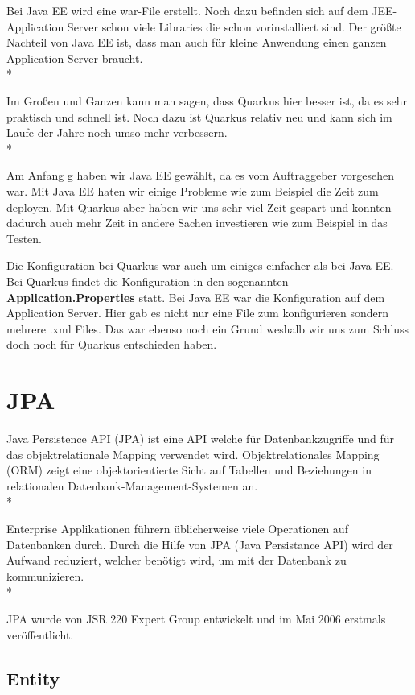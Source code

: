 Bei Java EE wird eine war-File erstellt. Noch dazu befinden sich auf dem JEE-Application Server schon viele Libraries die schon vorinstalliert sind. 
Der größte Nachteil von Java EE ist, dass man auch für kleine Anwendung einen ganzen Application Server braucht. \\*

Im Großen und Ganzen kann man sagen, dass Quarkus hier besser ist, da es sehr praktisch und schnell ist. 
Noch dazu ist Quarkus relativ neu und kann sich im Laufe der Jahre noch umso mehr verbessern. \\*

Am Anfang g haben wir Java EE gewählt, da es vom Auftraggeber vorgesehen war. Mit Java EE haten wir einige Probleme wie zum Beispiel die Zeit zum deployen. 
Mit Quarkus aber haben wir uns sehr viel Zeit gespart und konnten dadurch auch mehr Zeit in andere Sachen investieren wie zum Beispiel in das Testen.

Die Konfiguration bei Quarkus war auch um einiges einfacher als bei Java EE. Bei Quarkus findet die Konfiguration in den sogenannten \textbf{Application.Properties} statt.
Bei Java EE war die Konfiguration auf dem Application Server. Hier gab es nicht nur eine File zum konfigurieren sondern mehrere .xml Files. 
Das war ebenso noch ein Grund weshalb wir uns zum Schluss doch noch für Quarkus entschieden haben.

\pagebreak

\section{JPA}
\author{David Ignjatovic} 

Java Persistence API (JPA) ist eine API welche für Datenbankzugriffe und für das objektrelationale Mapping verwendet wird. 
Objektrelationales Mapping (ORM) zeigt eine objektorientierte Sicht auf Tabellen und Beziehungen in relationalen Datenbank-Management-Systemen an.  \\*

Enterprise Applikationen führern üblicherweise viele Operationen auf Datenbanken durch.
Durch die Hilfe von JPA (Java Persistance API) wird der Aufwand reduziert, welcher benötigt wird, um mit der Datenbank zu kommunizieren. \\* \cite{JPA}

JPA wurde von JSR 220 Expert Group entwickelt und im Mai 2006 erstmals veröffentlicht.

\subsection{Entity}
\author{David Ignjatovic} 

